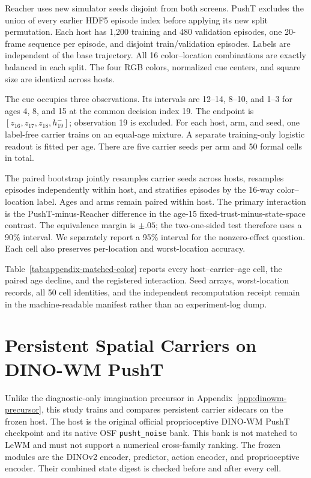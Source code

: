 Reacher uses new simulator seeds disjoint from both screens.  PushT excludes
the union of every earlier HDF5 episode index before applying its new split
permutation.  Each host has 1,200 training and 480 validation episodes, one
20-frame sequence per episode, and disjoint train/validation episodes.  Labels
are independent of the base trajectory.  All 16 color--location combinations
are exactly balanced in each split.  The four RGB colors, normalized cue
centers, and square size are identical across hosts.

The cue occupies three observations.  Its intervals are 12--14, 8--10, and
1--3 for ages 4, 8, and 15 at the common decision index 19.  The endpoint is
$[z_{16},z_{17},z_{18},h^-_{19}]$; observation 19 is excluded.  For each host,
arm, and seed, one label-free carrier trains on an equal-age mixture.  A
separate training-only logistic readout is fitted per age.  There are five
carrier seeds per arm and 50 formal cells in total.

The paired bootstrap jointly resamples carrier seeds across hosts, resamples
episodes independently within host, and stratifies episodes by the 16-way
color--location label.  Ages and arms remain paired within host.  The primary
interaction is the PushT-minus-Reacher difference in the age-15
fixed-trust-minus-state-space contrast.  The equivalence margin is $\pm.05$;
the two-one-sided test therefore uses a 90\% interval.  We separately report a
95\% interval for the nonzero-effect question.  Each cell also preserves
per-location and worst-location accuracy.

Table~\ref{tab:appendix-matched-color} reports every host--carrier--age cell,
the paired age decline, and the registered interaction.  Seed arrays,
worst-location records, all 50 cell identities, and the independent
recomputation receipt remain in the machine-readable manifest rather than an
experiment-log dump.

\PaperMatchedColorResults

\section{Persistent Spatial Carriers on DINO-WM PushT}
\label{app:dinowm-carrier}

Unlike the diagnostic-only imagination precursor in
Appendix~\ref{app:dinowm-precursor}, this study trains and compares persistent
carrier sidecars on the frozen host.
The host is the original official proprioceptive DINO-WM PushT checkpoint and
its native OSF \texttt{pusht\_noise} bank.  This bank is not matched to LeWM and
must not support a numerical cross-family ranking.  The frozen modules are the
DINOv2 encoder, predictor, action encoder, and proprioceptive encoder.  Their
combined state digest is checked before and after every cell.

